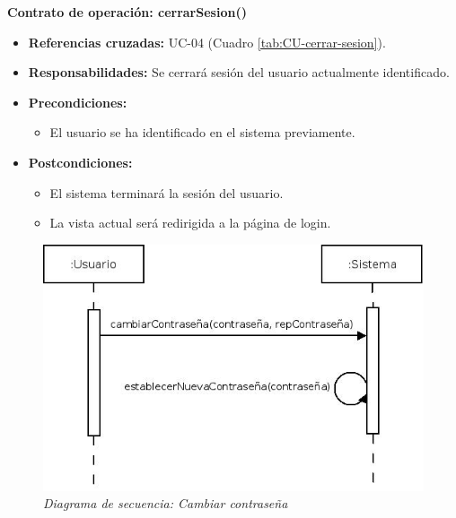 \textbf{Contrato de operación: cerrarSesion()}
\begin{itemize}
\item \textbf{Referencias cruzadas:} UC-04 (Cuadro \ref{tab:CU-cerrar-sesion}).
\item \textbf{Responsabilidades:} Se cerrará sesión del usuario actualmente identificado.
\item \textbf{Precondiciones:} 
 \begin{itemize}
\item El usuario se ha identificado en el sistema previamente.
\end {itemize}
\item \textbf{Postcondiciones:} 
 \begin{itemize}
\item El sistema terminará la sesión del usuario.
\item La vista actual será redirigida a la página de login.
\end {itemize}
\end {itemize}


\vspace{10mm}

\begin{figure}[H]
\centering
  \includegraphics[scale=.55]{img/secuencias/gestion-usuarios-cambiar-contrasena.jpeg}
  \caption{\textit{Diagrama de secuencia: Cambiar contraseña}}
  \label{fig:secuencia-gestion-usuarios-cambiar-contrasena}
\end{figure}

